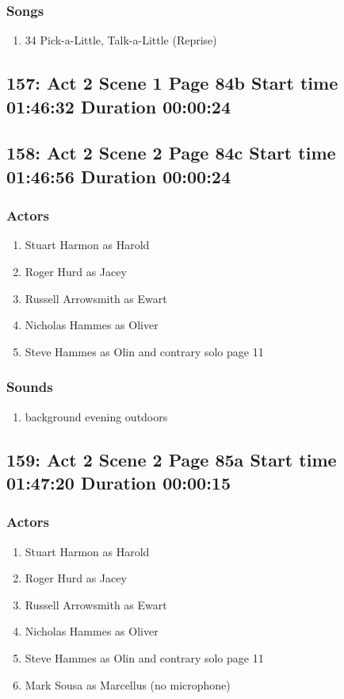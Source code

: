 \subsubsection{Songs}
\begin{enumerate}
\item 34 Pick-a-Little, Talk-a-Little (Reprise)
\end{enumerate}
\subsection{157: Act 2 Scene 1 Page 84b Start time 01:46:32 Duration 00:00:24}

\subsection{158: Act 2 Scene 2 Page 84c Start time 01:46:56 Duration 00:00:24}

\subsubsection{Actors}
\begin{enumerate}
\item Stuart Harmon as Harold
\item Roger Hurd as Jacey
\item Russell Arrowsmith as Ewart
\item Nicholas Hammes as Oliver
\item Steve Hammes as Olin and contrary solo page 11
\end{enumerate}

\subsubsection{Sounds}
\begin{enumerate}
\item background evening outdoors
\end{enumerate}
\subsection{159: Act 2 Scene 2 Page 85a Start time 01:47:20 Duration 00:00:15}

\subsubsection{Actors}
\begin{enumerate}
\item Stuart Harmon as Harold
\item Roger Hurd as Jacey
\item Russell Arrowsmith as Ewart
\item Nicholas Hammes as Oliver
\item Steve Hammes as Olin and contrary solo page 11
\item Mark Sousa as Marcellus (no microphone)
\end{enumerate}

